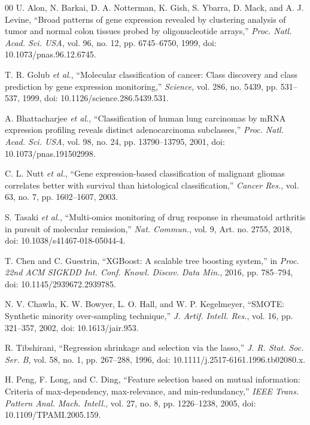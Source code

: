 \begin{thebibliography}{00}
 U. Alon, N. Barkai, D. A. Notterman, K. Gish, S. Ybarra, D. Mack, and A. J. Levine, ``Broad patterns of gene expression revealed by clustering analysis of tumor and normal colon tissues probed by oligonucleotide arrays,'' \textit{Proc. Natl. Acad. Sci. USA}, vol. 96, no. 12, pp. 6745--6750, 1999, doi: 10.1073/pnas.96.12.6745.

 T. R. Golub \textit{et al.}, ``Molecular classification of cancer: Class discovery and class prediction by gene expression monitoring,'' \textit{Science}, vol. 286, no. 5439, pp. 531--537, 1999, doi: 10.1126/science.286.5439.531.

 A. Bhattacharjee \textit{et al.}, ``Classification of human lung carcinomas by mRNA expression profiling reveals distinct adenocarcinoma subclasses,'' \textit{Proc. Natl. Acad. Sci. USA}, vol. 98, no. 24, pp. 13790--13795, 2001, doi: 10.1073/pnas.191502998.

 C. L. Nutt \textit{et al.}, ``Gene expression-based classification of malignant gliomas correlates better with survival than histological classification,'' \textit{Cancer Res.}, vol. 63, no. 7, pp. 1602--1607, 2003.

 S. Tasaki \textit{et al.}, ``Multi-omics monitoring of drug response in rheumatoid arthritis in pursuit of molecular remission,'' \textit{Nat. Commun.}, vol. 9, Art. no. 2755, 2018, doi: 10.1038/s41467-018-05044-4.

 T. Chen and C. Guestrin, ``XGBoost: A scalable tree boosting system,'' in \textit{Proc. 22nd ACM SIGKDD Int. Conf. Knowl. Discov. Data Min.}, 2016, pp. 785--794, doi: 10.1145/2939672.2939785.

 N. V. Chawla, K. W. Bowyer, L. O. Hall, and W. P. Kegelmeyer, ``SMOTE: Synthetic minority over-sampling technique,'' \textit{J. Artif. Intell. Res.}, vol. 16, pp. 321--357, 2002, doi: 10.1613/jair.953.

 R. Tibshirani, ``Regression shrinkage and selection via the lasso,'' \textit{J. R. Stat. Soc. Ser. B}, vol. 58, no. 1, pp. 267--288, 1996, doi: 10.1111/j.2517-6161.1996.tb02080.x.

 H. Peng, F. Long, and C. Ding, ``Feature selection based on mutual information: Criteria of max-dependency, max-relevance, and min-redundancy,'' \textit{IEEE Trans. Pattern Anal. Mach. Intell.}, vol. 27, no. 8, pp. 1226--1238, 2005, doi: 10.1109/TPAMI.2005.159.


\end{thebibliography}
